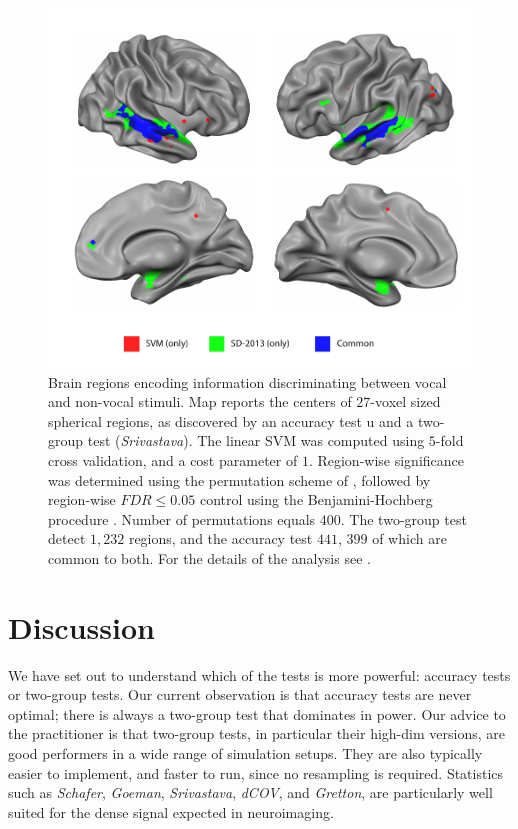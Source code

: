 \documentclass[journal]{IEEEtran}
\begin{document}
\begin{figure}[th]
	\centering
	\includegraphics[width=1\columnwidth]{"art/svm_vs_SD"}
	\caption{\footnotesize
		Brain regions encoding information discriminating between vocal and non-vocal stimuli.
		Map reports the centers of $27$-voxel sized spherical regions, as discovered by an accuracy test u and a two-group test (\emph{Srivastava}). 
		The linear SVM was computed using $5$-fold cross validation, and a cost parameter of $1$. 
		Region-wise significance was determined using the permutation scheme of \cite{stelzer_statistical_2013}, followed by region-wise $FDR \leq 0.05$ control using the Benjamini-Hochberg procedure \cite{benjamini_controlling_1995}.
		Number of permutations equals $400$.
		The two-group test detect $1,232$ regions, and the accuracy test $441$, $399$ of which are common to both.
		For the details of the analysis see \cite{gilron_quantifying_2016}.  
	}
	\label{fig:read_data}
\end{figure}








\section{Discussion}
\label{sec:discussion}

We have set out to understand which of the tests is more powerful: accuracy tests or two-group tests. 
Our current observation is that accuracy tests are never optimal; there is always a two-group test that dominates in power. 
Our advice to the practitioner is that two-group tests, in particular their high-dim versions, are good performers in a wide range of simulation setups. 
They are also typically easier to implement, and faster to run, since no resampling is required. 
Statistics such as \emph{Schafer}\cite{schafer_shrinkage_2005}, \emph{Goeman}\cite{goeman2006testing}, \emph{Srivastava}\cite{srivastava_multivariate_2007}, \emph{dCOV}\cite{szekely2004testing}, and \emph{Gretton}\cite{gretton_kernel_2012-1}, are particularly well suited for the dense signal expected in neuroimaging.
\end{document}
